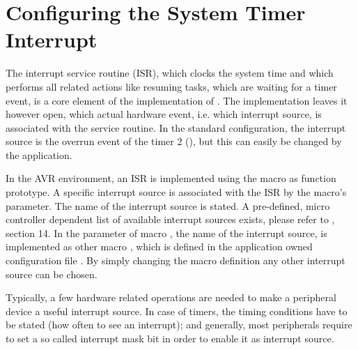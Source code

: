 

\section{Configuring the System Timer Interrupt}

The interrupt service routine (ISR), which clocks the system time and
which performs all related actions like resuming tasks, which are waiting
for a timer event, is a core element of the implementation of \rtos{}. The
implementation leaves it however open, which actual hardware event, i.e.
which interrupt source, is associated with the service routine. In the
standard configuration, the interrupt source is the overrun event of the
timer 2 (), but this can easily be changed by the
application.

In the AVR environment, an ISR is implemented using the macro 
as function prototype. A specific interrupt source is associated with the
ISR by the macro's parameter. The name of the interrupt source is stated.
A pre-defined, micro controller dependent list of available interrupt
sources exists, please refer to , section 14. In \rtos{}
the parameter of macro , the name of the interrupt source, is
implemented as other macro , which is
defined in the application owned configuration file . By
simply changing the macro definition any other interrupt source can be
chosen.

Typically, a few hardware related operations are needed to make a
peripheral device a useful interrupt source. In case of timers, the timing
conditions have to be stated (how often to see an interrupt); and
generally, most peripherals require to set a so called interrupt mask bit
in order to enable it as interrupt source.

